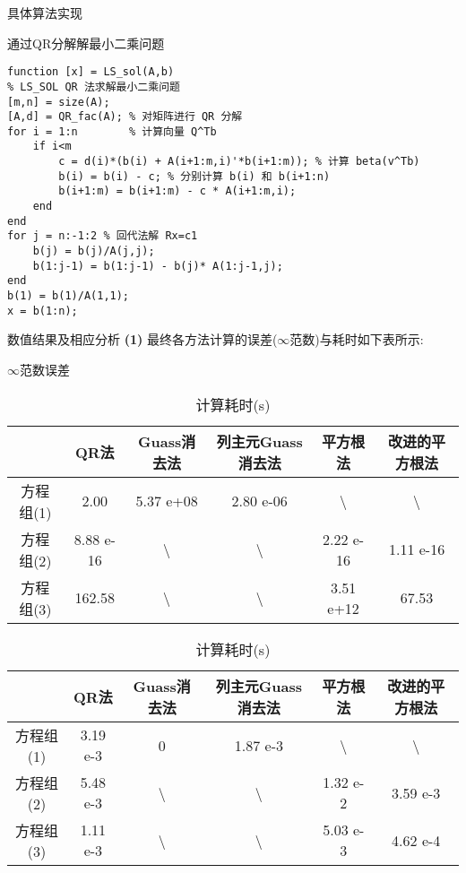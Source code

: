\documentclass{article}
\begin{document}
\begin{section}{具体算法实现}
    \begin{subsection}{通过QR分解解最小二乘问题}
        \begin{lstlisting}
function [x] = LS_sol(A,b)
% LS_SOL QR 法求解最小二乘问题
[m,n] = size(A);
[A,d] = QR_fac(A); % 对矩阵进行 QR 分解
for i = 1:n        % 计算向量 Q^Tb
    if i<m
        c = d(i)*(b(i) + A(i+1:m,i)'*b(i+1:m)); % 计算 beta(v^Tb)
        b(i) = b(i) - c; % 分别计算 b(i) 和 b(i+1:n)
        b(i+1:m) = b(i+1:m) - c * A(i+1:m,i);
    end
end
for j = n:-1:2 % 回代法解 Rx=c1
    b(j) = b(j)/A(j,j);
    b(1:j-1) = b(1:j-1) - b(j)* A(1:j-1,j);
end
b(1) = b(1)/A(1,1);
x = b(1:n);
        \end{lstlisting}
    \end{subsection} 
\end{section}

\begin{section}{数值结果及相应分析}
\noindent\textbf{(1)} 最终各方法计算的误差($\infty$范数)与耗时如下表所示:
\begin{table}[htbp!]
    \caption{$\infty$范数误差 }
    \begin{tabular}{cccccc}\hline
      & QR法      & Guass消去法         & 列主元Guass消去法      & 平方根法             & 改进的平方根法          \\ \hline
    方程组(1) & 2.00     & 5.37 e+08         & 2.80 e-06         & \textbackslash{} & \textbackslash{} \\
    方程组(2) & 8.88 e-16 & \textbackslash{} & \textbackslash{} & 2.22 e-16         & 1.11 e-16         \\
    方程组(3) & 162.58 & \textbackslash{} & \textbackslash{} & 3.51 e+12         & 67.53      \\  \hline
    \end{tabular}
    \caption{计算耗时(s)}
    \begin{tabular}{cccccc}\hline
        & QR法      & Guass消去法         & 列主元Guass消去法      & 平方根法             & 改进的平方根法          \\ \hline
    方程组(1) & 3.19 e-3 & 0                & 1.87 e-3         & \textbackslash{} & \textbackslash{} \\
    方程组(2) & 5.48 e-3 & \textbackslash{} & \textbackslash{} & 1.32 e-2         & 3.59 e-3         \\
    方程组(3) & 1.11 e-3 & \textbackslash{} & \textbackslash{} & 5.03 e-3         & 4.62 e-4    \\ \hline    
    \end{tabular}
    \end{table}


\end{section}
\end{document}
